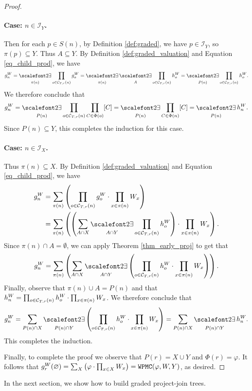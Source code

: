 \begin{proof}
\paragraph{Case: $n \in \mathcal{I}_Y$.} Then for each $p \in S(n)$, by Definition \ref{def:graded}, we have $p \in \mathcal{I}_Y$, so $\pi(p) \subseteq Y$. Thus $A \subseteq Y$. 
By Definition \ref{def:graded_valuation} and Equation \eqref{eq_child_prod}, we have
\begin{equation*}
    g^W_n = \displaystyle\exist_{\pi(n)} \prod_{o \in \C{T}{r}{n}} g^W_o = \displaystyle\exist_{\pi(n)} \displaystyle\exist_{A} \prod_{o \in \C{T}{r}{n}} h^W_o = \displaystyle\exist_{P(n)} \prod_{o \in \C{T}{r}{n}} h^W_o.
\end{equation*}
We therefore conclude that $$g^W_n = \displaystyle\exist_{P(n)} \prod_{o \in \C{T}{r}{n}} \prod_{C \in \Phi(o)} [C] = \displaystyle\exist_{P(n)} \prod_{C \in \Phi(n)} [C] = \displaystyle\exist_{P(n)} h^W_n.$$
Since $P(n) \subseteq Y$, this completes the induction for this case.


\paragraph{Case: $n \in \mathcal{I}_X$.} Thus $\pi(n) \subseteq X$. 
By Definition \ref{def:graded_valuation} and Equation \eqref{eq_child_prod}, we have
\begin{align*}
    g^W_n 
    &= \displaystyle\sum_{\pi(n)} \pars{ \prod_{o \in \C T r n} g^W_o \cdot \prod_{x \in \pi(n)} W_x }\\ 
    &= \sum_{\pi(n)} \pars{ \pars{ \sum_{A \cap X} \displaystyle\exist_{A \cap Y} \prod_{o \in \C{T}{r}{n}} h^W_o } \cdot \prod_{x \in \pi(n)} W_x }.
\end{align*}
Since $\pi(n) \cap A = \emptyset$, we can apply Theorem \ref{thm_early_proj} to get that
\begin{equation*}
    g^W_n = \sum_{\pi(n)} \pars{ \sum_{A \cap X} \displaystyle\exist_{A \cap Y} \left( \prod_{o \in \C{T}{r}{n}} h^W_o \cdot \prod_{x \in \pi(n)} W_x \right) }.
\end{equation*}
Finally, observe that $\pi(n) \cup A = P(n)$ and that $h^W_n = \prod_{o \in \mathcal{C}_{T,r}(n)} h^W_o \cdot \prod_{x \in \pi(n)} W_x$. We therefore conclude that
\begin{equation*}
    g^W_n = \sum_{P(n) \cap X} \displaystyle\exist_{P(n) \cap Y} \left( \prod_{o \in \C{T}{r}{n}} h^W_o \cdot \prod_{x \in \pi(n)} W_x \right) =  \sum_{P(n) \cap X} \displaystyle\exist_{P(n) \cap Y} h^W_n.
\end{equation*}
This completes the induction.

Finally, to complete the proof we observe that $P(r) = X \cup Y$ and $\Phi(r) = \varphi$. It follows that $g^W_r(\varnothing) = \sum_X \left(  \varphi \cdot \prod_{x \in X} W_x  \right) = \texttt{\upshape WPMC}(\varphi, W, Y)$, as desired.
\end{proof}

In the next section, we show how to build graded project-join trees.